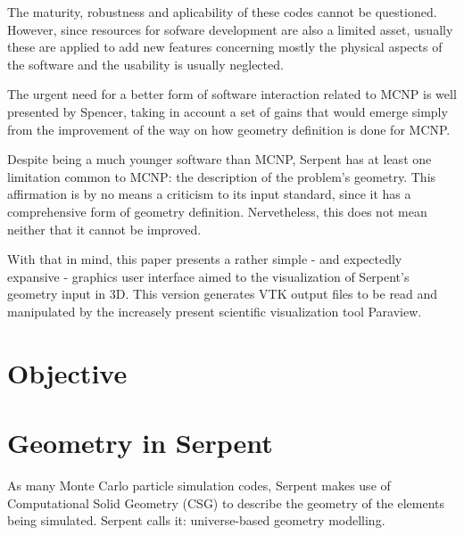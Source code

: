 \documentclass{elsarticle}
\begin{document}
The maturity, robustness and aplicability of these codes cannot be questioned.
However, since resources for sofware development are also a limited asset,
usually these are applied to add new features concerning mostly the physical aspects of the software and the usability is usually neglected.

The urgent need for a better form of software interaction related to MCNP
is well presented by Spencer\cite{Spencer2017}, taking in account a set of gains that would emerge simply from the improvement of the way on how geometry definition is done for MCNP.

Despite being a much younger software than MCNP, Serpent has at least one limitation common to MCNP: the description of the problem's geometry. This affirmation is by no means a criticism to its input standard, since it has a comprehensive form of geometry
definition. Nervetheless, this does not mean neither that it cannot be improved.

With that in mind, this paper presents a rather simple - and expectedly expansive -
graphics user interface aimed to the visualization of Serpent's geometry input
in 3D. This version generates VTK output files to be read and manipulated by
the increasely present scientific visualization tool Paraview\cite{paraview}.

\section{Objective}


\section{Geometry in Serpent}

As many Monte Carlo particle simulation codes, Serpent makes use of Computational Solid Geometry (CSG) to
describe the geometry of the elements being simulated. Serpent calls it: universe-based geometry modelling.


\end{document}
